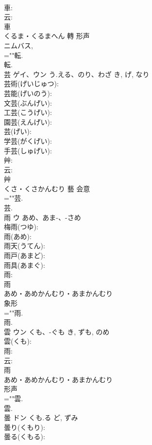 \documentclass[8pt]{extreport}
\begin{document}
\begin{CJK}{UTF8}{min}
\\	車: 
\\	云: 
\\	車	
\\	くるま・くるまへん	轉	形声 
\\	{ニム}バス, 
\\	=""転.
\\	転.
\\	芸	ゲイ、ウン	う.える、のり、わざ	き, げ, なり	
\\	芸術(げいじゅつ): 
\\	芸能(げいのう): 
\\	文芸(ぶんげい): 
\\	工芸(こうげい): 
\\	園芸(えんげい): 
\\	芸(げい): 
\\	学芸(がくげい): 
\\	手芸(しゅげい): 
\\	艸: 
\\	云: 
\\	艸	
\\	くさ・くさかんむり	藝	会意 
\\	=""芸.
\\	芸.
\\	雨	ウ	あめ、あま-、-さめ		
\\	梅雨(つゆ): 
\\	雨(あめ): 
\\	雨天(うてん): 
\\	雨戸(あまど): 
\\	雨具(あまぐ): 
\\	雨: 
\\	雨	
\\	あめ・あめかんむり・あまかんむり	
\\	象形 
\\	=""雨.
\\	雨.
\\	雲	ウン	くも、-ぐも	き, ずも, のめ	
\\	雲(くも): 
\\	雨: 
\\	云: 
\\	雨	
\\	あめ・あめかんむり・あまかんむり	
\\	形声 
\\	=""雲.
\\	雲.
\\	曇	ドン	くも.る	ど, ずみ	
\\	曇り(くもり): 
\\	曇る(くもる): 

\end{CJK}
\end{document}
